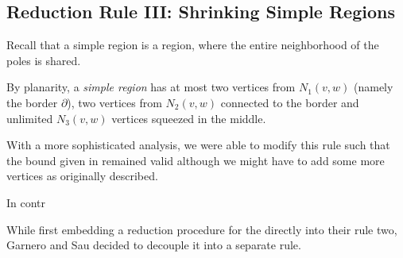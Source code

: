 \subsection{Reduction Rule III: Shrinking Simple Regions}

Recall that a simple region is a region, where the entire neighborhood of the poles is shared.  


By planarity, a \textit{simple region} has at most two vertices from $N_1(v,w)$ (namely the border $\partial$), two vertices from $N_2(v,w)$ connected to the border and unlimited $N_3(v,w)$ vertices squeezed in the middle.

With a more sophisticated analysis, we were able to modify this rule such that the bound given in \cite{Garnero2018} remained valid although we might have to add some more vertices as originally described.

In contr



%
%
%
%
%
%
%
%
%
While first embedding a reduction procedure for the \ptdom directly into their rule two, Garnero and Sau \cite{Garnero2018} decided to decouple it into a separate rule.

